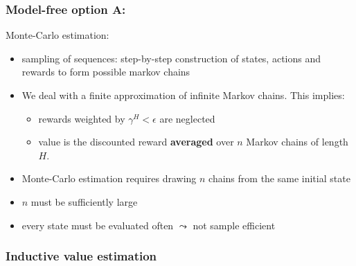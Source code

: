 \begin{frame}\frametitle{Model-free option A:~\subsecname}

Monte-Carlo estimation:

	\begin{itemize}
		\item sampling of sequences: step-by-step construction of states, actions and rewards to form possible markov chains
		\item We deal with a finite approximation of infinite Markov chains. This implies:
			\begin{itemize}
				\item rewards weighted by $\gamma^H < \epsilon$ are neglected
				\item value is the discounted reward \textbf{averaged} over $n$ Markov chains of length $H$. 
			\end{itemize}
		
		
		\pause 
		
		\item Monte-Carlo estimation requires drawing $n$ chains 
			from the same initial state %
		\item $n$ must be sufficiently large
		\item every state must be evaluated often 
			$\leadsto$ not sample efficient
	\end{itemize}
	
\end{frame}

\subsubsection{Inductive value estimation}

